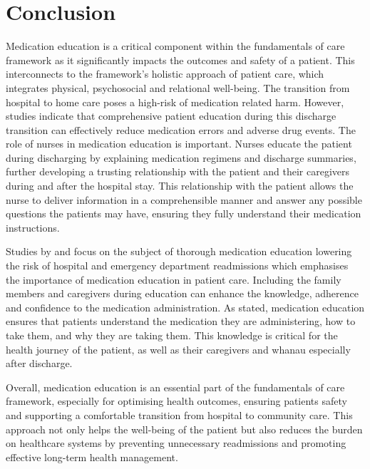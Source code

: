 \documentclass[british,12pt,a4paper]{article}
\begin{document}
	\section{Conclusion}
	Medication education is a critical component within the fundamentals of care framework as it significantly impacts the outcomes and safety of a patient. This interconnects to the framework's holistic approach of patient care, which integrates physical, psychosocial and relational well-being. The transition from hospital to home care poses a high-risk of medication related harm. However, studies indicate that comprehensive patient education during this discharge transition can effectively reduce medication errors and adverse drug events. The role of nurses in medication education is important. Nurses educate the patient during discharging by explaining medication regimens and discharge summaries, further developing a trusting relationship with the patient and their caregivers during and after the hospital stay. This relationship with the patient allows the nurse to deliver information in a comprehensible manner and answer any possible questions the patients may have, ensuring they fully understand their medication instructions.

	Studies by \citeauthor{Alper2023} and \citeauthor{Phatak2015} focus on the subject of thorough medication education lowering the risk of hospital and emergency department readmissions which emphasises the importance of medication education in patient care. Including the family members and caregivers during education can enhance the knowledge, adherence and confidence to the medication administration. As \citeauthor{Alper2023} stated, medication education ensures that patients understand the medication they are administering, how to take them, and why they are taking them. This knowledge is critical for the health journey of the patient, as well as their caregivers and whanau especially after discharge.

	Overall, medication education is an essential part of the fundamentals of care framework, especially for optimising health outcomes, ensuring patients safety and supporting a comfortable transition from hospital to community care. This approach not only helps the well-being of the patient but also reduces the burden on healthcare systems by preventing unnecessary readmissions and promoting effective long-term health management.
\end{document}
